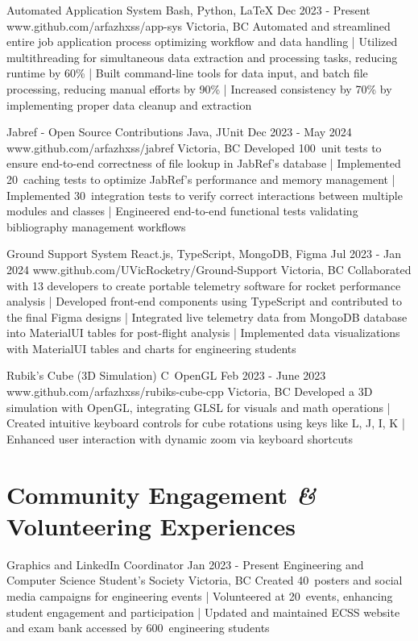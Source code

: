 \documentclass[a4paper,10pt]{article}
\begin{document}
\projectentry
{Automated Application System}
{Bash, Python, LaTeX}
{Dec 2023 - Present}
{www.github.com/arfazhxss/app-sys}
{Victoria, BC}
{Automated and streamlined entire job application process optimizing workflow and data handling
| Utilized multithreading for simultaneous data extraction and processing tasks, reducing runtime by 60\% 
| Built command-line tools for data input, and batch file processing, reducing manual efforts by 90\% 
| Increased consistency by 70\% by implementing proper data cleanup and extraction
}

\projectentry
{Jabref - Open Source Contributions}
{Java, JUnit}
{Dec 2023 - May 2024}
{www.github.com/arfazhxss/jabref}
{Victoria, BC}
{Developed 100\plus\ unit tests to ensure end-to-end correctness of file lookup in JabRef's database
| Implemented 20\plus\ caching tests to optimize JabRef's performance and memory management
| Implemented 30\plus\ integration tests to verify correct interactions between multiple modules and classes
| Engineered end-to-end functional tests validating bibliography management workflows
}

\projectentry
{Ground Support System}
{React.js, TypeScript, MongoDB, Figma}
{Jul 2023 - Jan 2024}
{www.github.com/UVicRocketry/Ground-Support}
{Victoria, BC}
{Collaborated with 13 developers to create portable telemetry software for rocket performance analysis 
| Developed front-end components using TypeScript and contributed to the final Figma designs
| Integrated live telemetry data from MongoDB database into MaterialUI tables for post-flight analysis
| Implemented data visualizations with MaterialUI tables and charts for engineering students 
}

\projectentry
{Rubik's Cube (3D Simulation)}
{C\plus\plus\, OpenGL}
{Feb 2023 - June 2023}
{www.github.com/arfazhxss/rubiks-cube-cpp}
{Victoria, BC}
{Developed a 3D simulation with OpenGL, integrating GLSL for visuals and math operations 
| Created intuitive keyboard controls for cube rotations using keys like L, J, I, K 
| Enhanced user interaction with dynamic zoom via keyboard shortcuts
}

\section{Community Engagement \textit{\&} Volunteering Experiences}

\volunteeringexperiences
{Graphics and LinkedIn Coordinator}
{Jan 2023 - Present}
{Engineering and Computer Science Student’s Society}
{Victoria, BC}
{Created 40\plus\ posters and social media campaigns for engineering events 
| Volunteered at 20\plus\ events, enhancing student engagement and participation 
| Updated and maintained ECSS website and exam bank accessed by 600\plus\ engineering students
}
\end{document}
